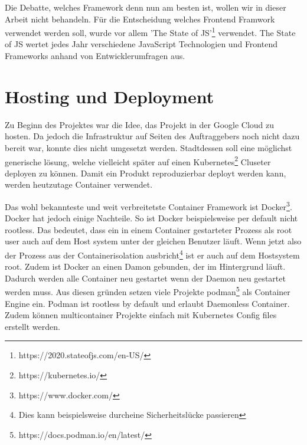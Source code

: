 
Die Debatte, welches Framework denn nun am besten ist, wollen wir in dieser Arbeit nicht behandeln.
Für die Entscheidung welches Frontend Framwork verwendet werden soll, wurde vor allem 'The State of JS'\footnote{https://2020.stateofjs.com/en-US/}
verwendet. The State of JS wertet jedes Jahr verschiedene JavaScript Technologien und Frontend Frameworks
anhand von Entwicklerumfragen aus.\cite{state-of-js-2020-fwk}


\section{Hosting und Deployment}
\label{state:deployment}

Zu Beginn des Projektes war die Idee, das Projekt in der Google Cloud zu hosten.
Da jedoch die Infrastruktur auf Seiten des Auftraggebers noch nicht dazu bereit
war, konnte dies nicht umgesetzt werden. Stadtdessen soll eine möglichst
generische lösung, welche vielleicht später auf einen Kubernetes\footnote{https://kubernetes.io/}
Cluseter deployen zu können. Damit ein Produkt reproduzierbar
deployt werden kann, werden heutzutage Container verwendet. \cite{what-is-a-container}

Das wohl bekannteste und weit verbreitetste Container Framework
ist Docker\footnote{https://www.docker.com/}. Docker hat jedoch einige Nachteile.
So ist Docker beispielsweise per default nicht rootless.\cite{docker:rootless}
Das bedeutet, dass ein in einem Container gestarteter Prozess als root user
auch auf dem Host system unter der gleichen Benutzer läuft. Wenn jetzt also
der Prozess aus der Containerisolation ausbricht\footnote{Dies kann beispielsweise durcheine Sicherheitslücke passieren}
ist er auch auf dem Hostsystem root.\cite{so_2020}
Zudem ist Docker an einen Damon gebunden, der im Hintergrund läuft.
Dadurch werden alle Container neu gestartet wenn der Daemon neu gestartet werden muss.\cite{docker:daemon}
Aus diesen gründen setzen viele Projekte podman\footnote{https://docs.podman.io/en/latest/}
als Container Engine ein. Podman ist rootless by default und erlaubt Daemonless Container.
Zudem können multicontainer Projekte einfach mit Kubernetes Config files
erstellt werden.\cite{redhat:podman-pods}